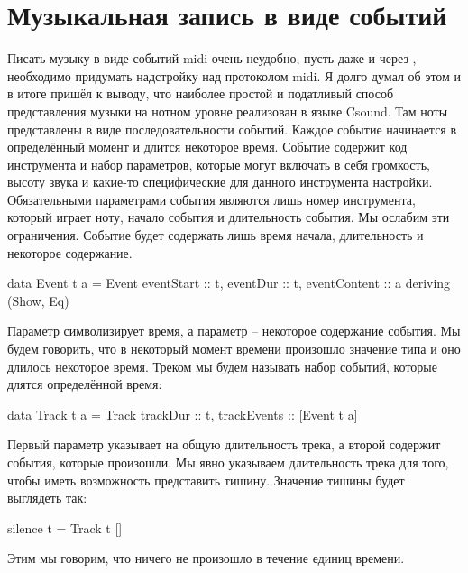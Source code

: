 \begin{code}
[(0, e1), (0, e2), (0, e3), (10, e4), (0, e5)]
\end{code}

\section{Музыкальная запись в виде событий}

Писать музыку в виде событий midi очень неудобно, пусть даже и через
, необходимо придумать надстройку над протоколом midi. Я
долго думал об этом и в итоге пришёл к выводу, что наиболее простой и
податливый способ представления музыки на нотном уровне реализован в
языке Csound. Там ноты представлены в виде последовательности событий.
Каждое событие начинается в определённый момент и длится некоторое
время. Событие содержит код инструмента и набор параметров, которые
могут включать в себя громкость, высоту звука и какие-то специфические
для данного инструмента настройки. Обязательными параметрами события
являются лишь номер инструмента, который играет ноту, начало события и
длительность события. Мы ослабим эти ограничения. Событие будет
содержать лишь время начала, длительность и некоторое содержание.


\begin{code}
data Event t a = Event {
    eventStart      :: t,
    eventDur        :: t,
    eventContent    :: a
    } deriving (Show, Eq)
\end{code}

Параметр  символизирует время, а параметр  -- некоторое
содержание события. Мы будем говорить, что в некоторый момент времени
произошло значение типа  и оно длилось некоторое время. Треком мы
будем называть набор событий, которые длятся определённой время:


\begin{code}
data Track t a = Track {
    trackDur        :: t,
    trackEvents     :: [Event t a] 
    } 
\end{code}

Первый параметр указывает на общую длительность трека, а второй содержит
события, которые произошли. Мы явно указываем длительность трека для
того, чтобы иметь возможность представить тишину. Значение тишины будет
выглядеть так:


\begin{code}
silence t = Track t []
\end{code}

Этим мы говорим, что ничего не произошло в течение  единиц
времени.

